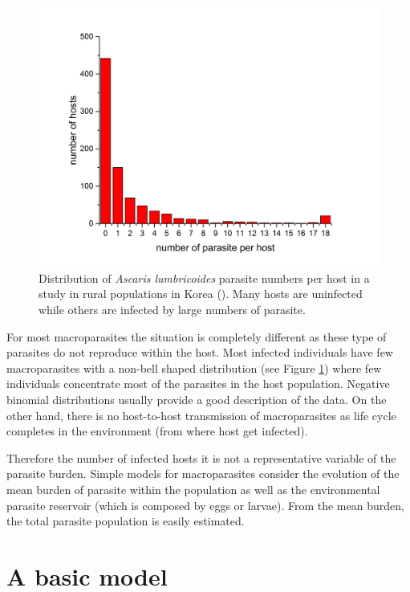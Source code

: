 \documentclass[12pt,a4paper]{article}
\theoremstyle{plain}%
\theoremstyle{definition}
\theoremstyle{remark}
\begin{document}
\begin{figure}[t!]
	\centering
	\includegraphics[width=0.99\linewidth]{dataseo}
	\caption{Distribution of \textit{Ascaris lumbricoides} parasite numbers per host in a study in rural populations in Korea (\cite{seo1979frequency}). 
	Many hosts are uninfected while others are infected by large numbers of parasite.}
	\label{fig:dataseo}
\end{figure}

For most macroparasites the situation is completely different as these type of parasites do not reproduce within the host.  Most  infected  individuals have few macroparasites with a non-bell shaped distribution (see Figure \ref{fig:dataseo}) where few individuals concentrate most of the parasites in the host population. Negative binomial distributions usually provide a good description of the data. On the other hand, there is no host-to-host transmission of macroparasites as life cycle completes in the environment (from where host get infected).  


Therefore the number of infected hosts it is not a representative variable of the parasite burden. Simple models for macroparasites consider the evolution of the mean burden of parasite within the population as well as the environmental parasite reservoir (which is composed by eggs or larvae). From the mean burden, the total parasite population is easily estimated. 


	
\section{A basic model}
\label{s:basicmodel}
 
\end{document}
